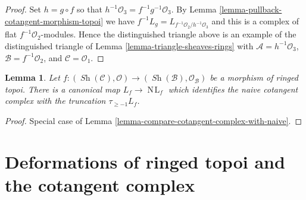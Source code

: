 \documentclass[10pt,a4paper]{article}
\theoremstyle{plain}
\newtheorem{lemma}[subsection]{Lemma}
\theoremstyle{definition}
\theoremstyle{remark}
\numberwithin{equation}{subsection}
\def\Sh{\mathop{\mathit{Sh}}\nolimits}
\def\NL{\mathop{N\!L}\nolimits}
\begin{document}
\begin{proof}
Set $h = g \circ f$ so that $h^{-1}\mathcal{O}_3 = f^{-1}g^{-1}\mathcal{O}_3$.
By Lemma \ref{lemma-pullback-cotangent-morphism-topoi} we have
$f^{-1}L_g = L_{f^{-1}\mathcal{O}_2/h^{-1}\mathcal{O}_3}$
and this is a complex of flat $f^{-1}\mathcal{O}_2$-modules.
Hence the distinguished triangle above is an example of the
distinguished triangle of
Lemma \ref{lemma-triangle-sheaves-rings}
with $\mathcal{A} = h^{-1}\mathcal{O}_3$, $\mathcal{B} = f^{-1}\mathcal{O}_2$,
and $\mathcal{C} = \mathcal{O}_1$.
\end{proof}

\begin{lemma}
\label{lemma-compare-cotangent-complex-with-naive-ringed-topoi}
Let $f : (\Sh(\mathcal{C}), \mathcal{O}) \to
(\Sh(\mathcal{B}), \mathcal{O}_\mathcal{B})$ be a morphism of
ringed topoi. There is a canonical map $L_f \to \NL_f$ which
identifies the naive cotangent complex with the truncation
$\tau_{\geq -1}L_f$.
\end{lemma}

\begin{proof}
Special case of Lemma \ref{lemma-compare-cotangent-complex-with-naive}.
\end{proof}








\section{Deformations of ringed topoi and the cotangent complex}
\label{section-deformations-ringed-topoi}
\end{document}
